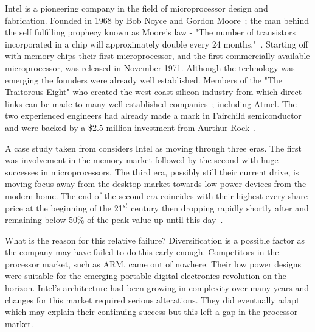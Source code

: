 

Intel is a pioneering company in the field of microprocessor design and fabrication.
Founded in 1968 by Bob Noyce and Gordon Moore~\cite{IntelHistory}; the man behind the self fulfilling prophecy known as Moore's law - "The number of transistors incorporated in a chip will approximately double every 24 months."~\cite{IntelMoore}.
Starting off with memory chips their first microprocessor, and the first commercially available microprocessor, was released in November 1971.
Although the technology was emerging the founders were already well established.
Members of the "The Traitorous Eight" who created the west coast silicon industry from which direct links can be made to many well established companies~\cite{Eight}; including Atmel.
The two experienced engineers had already made a mark in Fairchild semiconductor~\cite{Fairchild} and were backed by a \$2.5 million investment from Aurthur Rock~\cite{IntelStartup}.

A case study taken from \cite{johnson2008exploring} considers Intel as moving through three eras.
The first was involvement in the memory market followed by the second with huge successes in microprocessors.
The third era, possibly still their current drive, is moving focus away from the desktop market towards low power devices from the modern home.
The end of the second era coincides with their highest every share price at the beginning of the 21$^{st}$ century then dropping rapidly shortly after and remaining below 50\% of the peak value up until this day~\cite{IntelStock}.

What is the reason for this relative failure?
Diversification is a possible factor as the company may have failed to do this early enough.
Competitors in the processor market, such as ARM, came out of nowhere.
Their low power designs were suitable for the emerging portable digital electronics revolution on the horizon.
Intel's architecture had been growing in complexity over many years and changes for this market required serious alterations.
They did eventually adapt which may explain their continuing success but this left a gap in the processor market.
